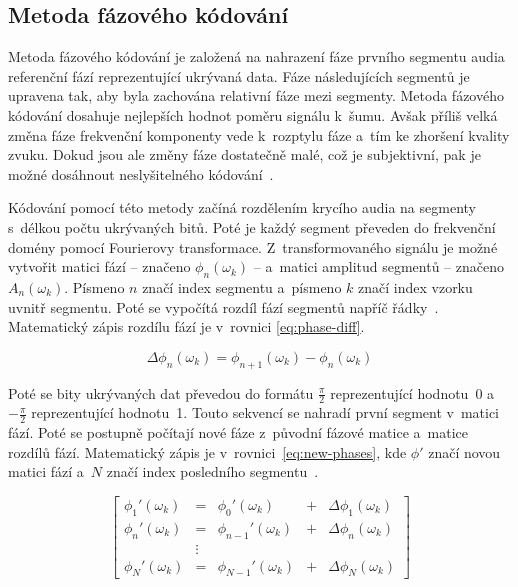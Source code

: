 \subsection*{Metoda fázového kódování}
\label{sub:phase-coding}

Metoda fázového kódování je založená na nahrazení fáze prvního segmentu audia
referenční fází reprezentující ukrývaná data. Fáze následujících segmentů je
upravena tak, aby byla zachována relativní fáze mezi segmenty. Metoda fázového
kódování dosahuje nejlepších hodnot poměru signálu k~šumu. Avšak příliš velká
změna fáze frekvenční komponenty vede k~rozptylu fáze a~tím ke zhoršení kvality
zvuku. Dokud jsou ale změny fáze dostatečně malé, což je subjektivní, pak je
možné dosáhnout neslyšitelného kódování~\cite{Bender1996}.

Kódování pomocí této metody začíná rozdělením krycího audia na segmenty
s~délkou počtu ukrývaných bitů. Poté je každý segment převeden do frekvenční
domény pomocí Fourierovy transformace. Z~transformovaného signálu je možné
vytvořit matici fází -- značeno $\phi_n(\omega_k)$ -- a~matici amplitud
segmentů -- značeno $A_n(\omega_k)$. Písmeno $n$ značí index segmentu a~písmeno
$k$ značí index vzorku uvnitř segmentu. Poté se vypočítá rozdíl fází segmentů
napříč řádky~\cite{Bender1996}. Matematický zápis rozdílu fází je v~rovnici
\ref{eq:phase-diff}.

\begin{equation}
    \label{eq:phase-diff}
    \Delta\phi_n(\omega_k) = \phi_{n+1}(\omega_k) - \phi_n(\omega_k)
\end{equation}

\noindent Poté se bity ukrývaných dat převedou do formátu $\frac{\pi}{2}$
reprezentující hodnotu~0 a~$-\frac{\pi}{2}$ reprezentující hodnotu~1. Touto
sekvencí se nahradí první segment v~matici fází. Poté se postupně počítají nové
fáze z~původní fázové matice a~matice rozdílů fází. Matematický zápis je
v~rovnici~\ref{eq:new-phases}, kde $\phi'$ značí novou matici fází a~$N$
značí index posledního segmentu~\cite{Bender1996}.

\begin{equation}
    \label{eq:new-phases}
    \left[
        \begin{array}{lclcl}
            \phi_1'(\omega_k) & = & \phi_0'(\omega_k)     & + & \Delta\phi_1(\omega_k) \\
            \phi_n'(\omega_k) & = & \phi_{n-1}'(\omega_k) & + & \Delta\phi_n(\omega_k) \\
                              & \vdots \\
            \phi_N'(\omega_k) & = & \phi_{N-1}'(\omega_k) & + & \Delta\phi_N(\omega_k)
        \end{array}
    \right]
\end{equation}

